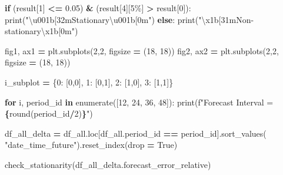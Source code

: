 \documentclass[mstat,12pt]{unswthesis}
\newenvironment{Shaded}{\begin{snugshade}}{\end{snugshade}}
\newcommand{\BuiltInTok}[1]{#1}
\newcommand{\CharTok}[1]{\textcolor[rgb]{0.31,0.60,0.02}{#1}}
\newcommand{\ControlFlowTok}[1]{\textcolor[rgb]{0.13,0.29,0.53}{\textbf{#1}}}
\newcommand{\DecValTok}[1]{\textcolor[rgb]{0.00,0.00,0.81}{#1}}
\newcommand{\FloatTok}[1]{\textcolor[rgb]{0.00,0.00,0.81}{#1}}
\newcommand{\KeywordTok}[1]{\textcolor[rgb]{0.13,0.29,0.53}{\textbf{#1}}}
\newcommand{\NormalTok}[1]{#1}
\newcommand{\OperatorTok}[1]{\textcolor[rgb]{0.81,0.36,0.00}{\textbf{#1}}}
\newcommand{\SpecialCharTok}[1]{\textcolor[rgb]{0.81,0.36,0.00}{\textbf{#1}}}
\newcommand{\SpecialStringTok}[1]{\textcolor[rgb]{0.31,0.60,0.02}{#1}}
\newcommand{\StringTok}[1]{\textcolor[rgb]{0.31,0.60,0.02}{#1}}
\newcommand{\VariableTok}[1]{\textcolor[rgb]{0.00,0.00,0.00}{#1}}
\begin{document}
\begin{Shaded}
\begin{Highlighting}[]
    \ControlFlowTok{if}\NormalTok{ (result[}\DecValTok{1}\NormalTok{] }\OperatorTok{\textless{}=} \FloatTok{0.05}\NormalTok{) }\OperatorTok{\&}\NormalTok{ (result[}\DecValTok{4}\NormalTok{][}\StringTok{\textquotesingle{}5\%\textquotesingle{}}\NormalTok{] }\OperatorTok{\textgreater{}}\NormalTok{ result[}\DecValTok{0}\NormalTok{]):}
        \BuiltInTok{print}\NormalTok{(}\StringTok{"}\CharTok{\textbackslash{}u001b}\StringTok{[32mStationary}\CharTok{\textbackslash{}u001b}\StringTok{[0m"}\NormalTok{)}
    \ControlFlowTok{else}\NormalTok{:}
        \BuiltInTok{print}\NormalTok{(}\StringTok{"}\CharTok{\textbackslash{}x1b}\StringTok{[31mNon{-}stationary}\CharTok{\textbackslash{}x1b}\StringTok{[0m"}\NormalTok{)}

\NormalTok{fig1, ax1 }\OperatorTok{=}\NormalTok{ plt.subplots(}\DecValTok{2}\NormalTok{,}\DecValTok{2}\NormalTok{, figsize }\OperatorTok{=}\NormalTok{ (}\DecValTok{18}\NormalTok{, }\DecValTok{18}\NormalTok{))}
\NormalTok{fig2, ax2 }\OperatorTok{=}\NormalTok{ plt.subplots(}\DecValTok{2}\NormalTok{,}\DecValTok{2}\NormalTok{, figsize }\OperatorTok{=}\NormalTok{ (}\DecValTok{18}\NormalTok{, }\DecValTok{18}\NormalTok{))}

\NormalTok{i\_subplot }\OperatorTok{=}\NormalTok{ \{}\DecValTok{0}\NormalTok{: [}\DecValTok{0}\NormalTok{,}\DecValTok{0}\NormalTok{], }\DecValTok{1}\NormalTok{: [}\DecValTok{0}\NormalTok{,}\DecValTok{1}\NormalTok{], }\DecValTok{2}\NormalTok{: [}\DecValTok{1}\NormalTok{,}\DecValTok{0}\NormalTok{], }\DecValTok{3}\NormalTok{: [}\DecValTok{1}\NormalTok{,}\DecValTok{1}\NormalTok{]\}}

\ControlFlowTok{for}\NormalTok{ i, period\_id }\KeywordTok{in} \BuiltInTok{enumerate}\NormalTok{([}\DecValTok{12}\NormalTok{, }\DecValTok{24}\NormalTok{, }\DecValTok{36}\NormalTok{, }\DecValTok{48}\NormalTok{]):}
    \BuiltInTok{print}\NormalTok{(}\SpecialStringTok{f"Forecast Interval = }\SpecialCharTok{\{}\BuiltInTok{round}\NormalTok{(period\_id}\OperatorTok{/}\DecValTok{2}\NormalTok{)}\SpecialCharTok{\}}\SpecialStringTok{"}\NormalTok{)}

\NormalTok{    df\_all\_delta }\OperatorTok{=}\NormalTok{ df\_all.loc[df\_all.period\_id }\OperatorTok{==}
\NormalTok{      period\_id].sort\_values(}
        \StringTok{"date\_time\_future"}\NormalTok{).reset\_index(drop }\OperatorTok{=} \VariableTok{True}\NormalTok{)}

\NormalTok{    check\_stationarity(df\_all\_delta.forecast\_error\_relative)}
    

\end{Highlighting}
\end{Shaded}
\end{document}
